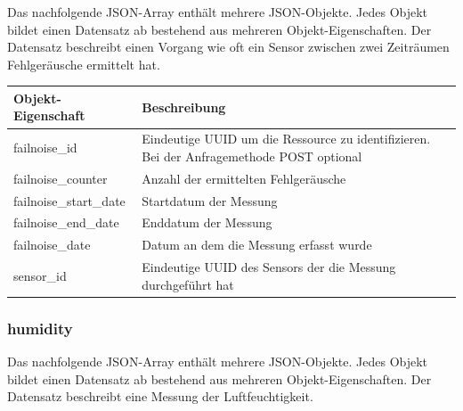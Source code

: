 Das nachfolgende JSON-Array enthält mehrere JSON-Objekte. Jedes Objekt bildet
einen Datensatz ab bestehend aus mehreren Objekt-Eigenschaften. Der Datensatz
beschreibt einen Vorgang wie oft ein Sensor zwischen zwei Zeiträumen
Fehlgeräusche ermittelt hat.

\begin{jsoncode}
\end{jsoncode}

\begin{table}[H]
  \begin{tabularx}{\textwidth}{lX}
    \textbf{Objekt-Eigenschaft} & \textbf{Beschreibung}                                                                     \\ \toprule
    failnoise\_id               & Eindeutige UUID um die Ressource zu identifizieren. Bei der Anfragemethode POST optional  \\
    failnoise\_counter          & Anzahl der ermittelten Fehlgeräusche                                                      \\
    failnoise\_start\_date      & Startdatum der Messung                                                                    \\
    failnoise\_end\_date        & Enddatum der Messung                                                                      \\
    failnoise\_date             & Datum an dem die Messung erfasst wurde                                                    \\
    sensor\_id                  & Eindeutige UUID des Sensors der die Messung durchgeführt hat                              \\
  \end{tabularx}
\end{table}

\subsubsection{humidity}%
\label{sec:rest.json.humidity}
Das nachfolgende JSON-Array enthält mehrere JSON-Objekte. Jedes Objekt bildet einen Datensatz ab bestehend aus mehreren Objekt-Eigenschaften. Der Datensatz beschreibt eine Messung der Luftfeuchtigkeit.


